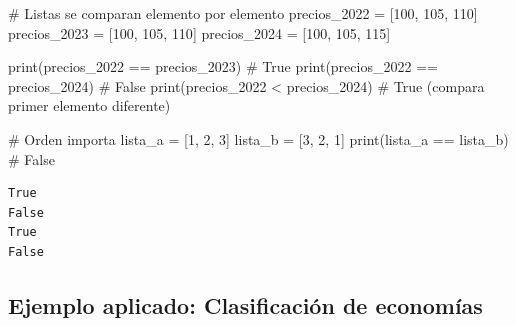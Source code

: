 \documentclass[
  doc,
  floatsintext,
  longtable,
  a4paper,
  nolmodern,
  notxfonts,
  notimes,
  12pt,
  colorlinks=true,linkcolor=blue,citecolor=blue,urlcolor=blue]{apa7}
\newenvironment{Shaded}{\begin{snugshade}}{\end{snugshade}}
\newcommand{\BuiltInTok}[1]{\textcolor[rgb]{0.00,0.23,0.31}{#1}}
\newcommand{\CommentTok}[1]{\textcolor[rgb]{0.37,0.37,0.37}{#1}}
\newcommand{\DecValTok}[1]{\textcolor[rgb]{0.68,0.00,0.00}{#1}}
\newcommand{\NormalTok}[1]{\textcolor[rgb]{0.00,0.23,0.31}{#1}}
\newcommand{\OperatorTok}[1]{\textcolor[rgb]{0.37,0.37,0.37}{#1}}
\begin{document}
\begin{Shaded}
\begin{Highlighting}[]
\CommentTok{\# Listas se comparan elemento por elemento}
\NormalTok{precios\_2022 }\OperatorTok{=}\NormalTok{ [}\DecValTok{100}\NormalTok{, }\DecValTok{105}\NormalTok{, }\DecValTok{110}\NormalTok{]}
\NormalTok{precios\_2023 }\OperatorTok{=}\NormalTok{ [}\DecValTok{100}\NormalTok{, }\DecValTok{105}\NormalTok{, }\DecValTok{110}\NormalTok{]}
\NormalTok{precios\_2024 }\OperatorTok{=}\NormalTok{ [}\DecValTok{100}\NormalTok{, }\DecValTok{105}\NormalTok{, }\DecValTok{115}\NormalTok{]}

\BuiltInTok{print}\NormalTok{(precios\_2022 }\OperatorTok{==}\NormalTok{ precios\_2023)  }\CommentTok{\# True}
\BuiltInTok{print}\NormalTok{(precios\_2022 }\OperatorTok{==}\NormalTok{ precios\_2024)  }\CommentTok{\# False}
\BuiltInTok{print}\NormalTok{(precios\_2022 }\OperatorTok{\textless{}}\NormalTok{ precios\_2024)   }\CommentTok{\# True (compara primer elemento diferente)}

\CommentTok{\# Orden importa}
\NormalTok{lista\_a }\OperatorTok{=}\NormalTok{ [}\DecValTok{1}\NormalTok{, }\DecValTok{2}\NormalTok{, }\DecValTok{3}\NormalTok{]}
\NormalTok{lista\_b }\OperatorTok{=}\NormalTok{ [}\DecValTok{3}\NormalTok{, }\DecValTok{2}\NormalTok{, }\DecValTok{1}\NormalTok{]}
\BuiltInTok{print}\NormalTok{(lista\_a }\OperatorTok{==}\NormalTok{ lista\_b)  }\CommentTok{\# False}
\end{Highlighting}
\end{Shaded}

\begin{verbatim}
True
False
True
False
\end{verbatim}

\subsection{Ejemplo aplicado: Clasificación de
economías}\label{ejemplo-aplicado-clasificaciuxf3n-de-economuxedas}
\end{document}
